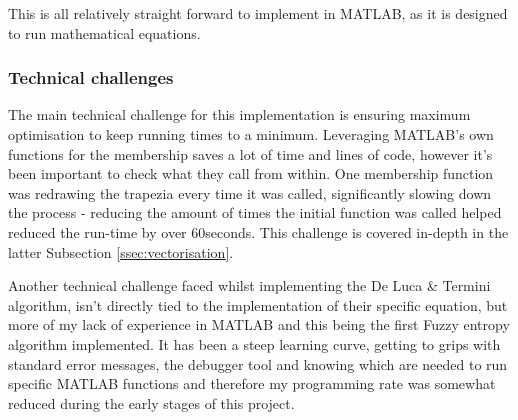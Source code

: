 This is all relatively straight forward to implement in MATLAB, as it is designed to run mathematical equations.


\subsubsection{Technical challenges}

The main technical challenge for this implementation is ensuring maximum optimisation to keep running times to a minimum. Leveraging MATLAB's own functions for the membership saves a lot of time and lines of code, however it's been important to check what they call from within. One membership function was redrawing the trapezia every time it was called, significantly slowing down the process - reducing the amount of times the initial function was called helped reduced the run-time by over 60seconds. This challenge is covered in-depth in the latter Subsection \ref{ssec:vectorisation}.

Another technical challenge faced whilst implementing the De Luca \& Termini algorithm, isn't directly tied to the implementation of their specific equation, but more of my lack of experience in MATLAB and this being the first Fuzzy entropy algorithm implemented. It has been a steep learning curve, getting to grips with standard error messages, the debugger tool and knowing which  are needed to run specific MATLAB functions and therefore my programming rate was somewhat reduced during the early stages of this project.
